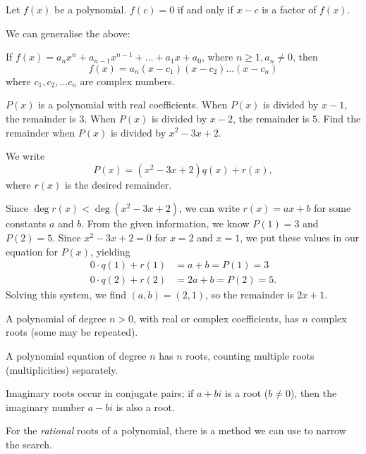 \begin{theorem}
Let $f(x)$ be a polynomial. $f(c)=0$ if and only if $x-c$ is a factor of $f(x)$.
\end{theorem}

We can generalise the above:

\begin{theorem}
If $f(x)=a_n x^n+a_{n-1} x^{n-1}+\dots+a_1 x+a_0$, where $n \ge 1, a_n \neq 0$, then
\[ f(x)=a_n (x-c_1)(x-c_2) \dots (x-c_n) \]
where $c_1, c_2, \dots c_n$ are complex numbers. 
\end{theorem}

\begin{exercise}[MA$\theta$ 1990]
$P(x)$ is a polynomial with real coefficients. When $P(x)$ is divided by $x-1$, the remainder is $3$. When $P(x)$ is divided by $x-2$, the remainder is $5$. Find the remainder when $P(x)$ is divided by $x^2-3x+2$.
\end{exercise}

\begin{solution}
We write
\[P(x)=(x^2-3x+2)q(x)+r(x),\]
where $r(x)$ is the desired remainder.

Since $\deg r(x)<\deg(x^2-3x+2)$, we can write $r(x)=ax+b$ for some constants $a$ and $b$. From the given information, we know $P(1)=3$ and $P(2)=5$. Since $x^2-3x+2=0$ for $x=2$ and $x=1$, we put these values in our equation for $P(x)$, yielding
\begin{align*}
0\cdot q(1)+r(1)&=a+b=P(1)=3\\
0\cdot q(2)+r(2)&=2a+b=P(2)=5.
\end{align*}
Solving this system, we find $(a,b)=(2,1)$, so the remainder is $2x+1$.
\end{solution}

\begin{theorem}
A polynomial of degree $n>0$, with real or complex coefficients, has $n$ complex roots (some may be repeated).
\end{theorem}

A polynomial equation of degree $n$ has $n$ roots, counting multiple roots (multiplicities) separately.

Imaginary roots occur in conjugate pairs; if $a+bi$ is a root ($b \neq 0$), then the imaginary number $a-bi$ is also a root.

For the \emph{rational} roots of a polynomial, there is a method we can use to narrow the search.


